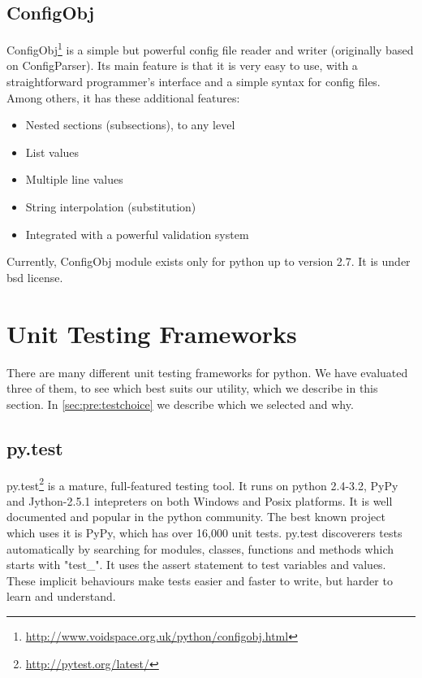 \subsection{ConfigObj}
ConfigObj\footnote{\url{http://www.voidspace.org.uk/python/configobj.html}} is
a simple but powerful config file reader and writer (originally based on
ConfigParser). Its main feature is that it is very easy to use, with a
straightforward programmer's interface and a simple syntax for config files.
Among others, it has these additional features:
\begin{itemize}
	\item Nested sections (subsections), to any level
	\item List values
	\item Multiple line values
	\item String interpolation (substitution)
	\item Integrated with a powerful validation system
\end{itemize}

\noindent Currently, ConfigObj module exists only for \Gls{python} up to version
2.7. It is under \Gls{bsd} license.


\section{Unit Testing Frameworks}
\label{sec:pre:testing}
There are many different unit testing frameworks for \Gls{python}. We have evaluated
three of them, to see which best suits our \gls{utility}, which we describe in this
section. In \autoref{sec:pre:testchoice} we describe which we selected and why.

\subsection{py.test}
py.test\footnote{\url{http://pytest.org/latest/}} is a mature, full-featured testing
tool. It runs on \Gls{python} 2.4-3.2, PyPy and Jython-2.5.1 intepreters on both
Windows and Posix platforms. It is well documented and popular in the \Gls{python}
community. The best known project which uses it is PyPy, which has over 16,000
unit tests. py.test discoverers tests automatically by searching for modules,
classes, functions and methods which starts with "test\_". It uses the assert
statement to test variables and values. These implicit behaviours make tests
easier and faster to write, but harder to learn and understand.

